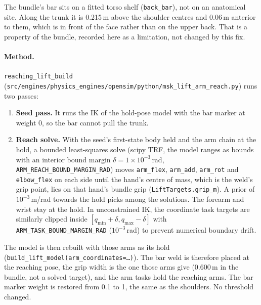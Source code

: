 \documentclass[11pt,a4paper]{article}
\begin{document}
The bundle's bar sits on a fitted torso shelf (\texttt{back\_bar}), not on
an anatomical site. Along the trunk it is 0.215\,m above the shoulder centres
and 0.06\,m anterior to them, which is in front of the face rather than on the
upper back. That is a property of the bundle, recorded here as a limitation,
not changed by this fix.

\paragraph{Method.} \texttt{reaching\_lift\_build}
(\texttt{src/engines/physics\_engines/opensim/python/msk\_lift\_arm\_reach.py})
runs two passes:
\begin{enumerate}[nosep]
\item \textbf{Seed pass.} It runs the IK of the hold-pose model with the bar
  marker at weight 0, so the bar cannot pull the trunk.
\item \textbf{Reach solve.} With the seed's first-state body held and the arm
  chain at the hold, a bounded least-squares solve (scipy TRF, the model
  ranges as bounds with an interior bound margin $\delta = 1\times 10^{-3}$\,rad,
  \texttt{ARM\_REACH\_BOUND\_MARGIN\_RAD}) moves \texttt{arm\_flex}, \texttt{arm\_add},
  \texttt{arm\_rot} and \texttt{elbow\_flex} on each side until the hand's
  centre of mass, which is the weld's grip point, lies on that hand's bundle
  grip (\texttt{LiftTargets.grip\_m}). A prior of $10^{-3}$\,m/rad towards
  the hold picks among the solutions. The forearm and wrist stay at the hold.
  In unconstrained IK, the coordinate task targets are similarly clipped inside
  $[q_\mathrm{min} + \delta, q_\mathrm{max} - \delta]$ with
  \texttt{ARM\_TASK\_BOUND\_MARGIN\_RAD} ($10^{-3}$\,rad) to prevent numerical boundary drift.
\end{enumerate}
The model is then rebuilt with those arms as its hold
(\texttt{build\_lift\_model(arm\_coordinates=\ldots)}). The bar weld is
therefore placed at the reaching pose, the grip width is the one those arms
give (0.600\,m in the bundle, not a solved target), and the arm tasks hold the
reaching arms. The bar marker weight is restored from 0.1 to 1, the same as
the shoulders. No threshold changed.
\end{document}
